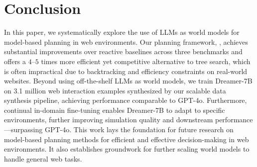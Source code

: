 \section{Conclusion}
In this paper, we systematically explore the use of LLMs as world models for model-based planning in web environments.
Our planning framework, \OurMethod, achieves substantial improvements over reactive baselines across three benchmarks and offers a $4$--$5$ times more efficient yet competitive alternative to tree search, which is often impractical due to backtracking and efficiency constraints on real-world websites.
Beyond using off-the-shelf LLMs as world models, we train Dreamer-7B on 3.1 million web interaction examples synthesized by our scalable data synthesis pipeline, achieving performance comparable to GPT-4o.
Furthermore, continual in-domain fine-tuning enables Dreamer-7B to adapt to specific environments, further improving simulation quality and downstream performance---surpassing GPT-4o.
This work lays the foundation for future research on model-based planning methods for efficient and effective decision-making in web environments.
It also establishes groundwork for further scaling world models to handle general web tasks.